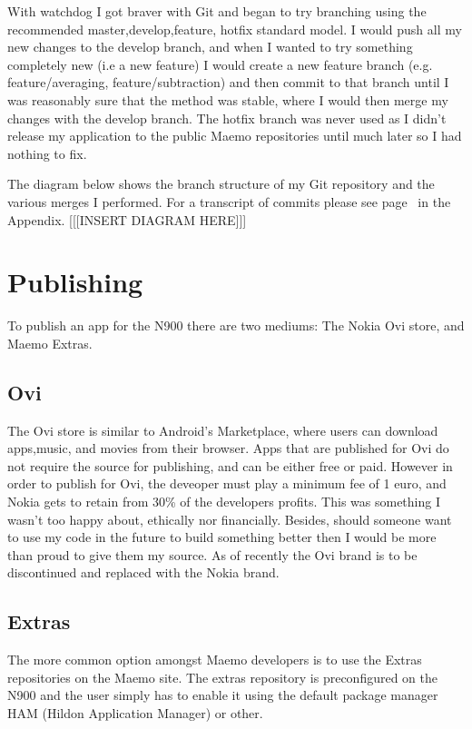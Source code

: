 With watchdog I got braver with Git and began to try branching using the recommended master,develop,feature, hotfix standard model. I would push all my new changes to the develop branch, and when I wanted to try something completely new (i.e a new feature) I would create a new feature branch (e.g. feature/averaging, feature/subtraction) and then commit to that branch until I was reasonably sure that the method was stable, where I would then merge my changes with the develop branch. The hotfix branch was never used as I didn’t release my application to the public Maemo repositories until much later so I had nothing to fix.

The diagram below shows the branch structure of my Git repository and the various merges I performed. For a transcript of commits please see page~\pageref{commits} in the Appendix.
[[[INSERT DIAGRAM HERE]]]



\section{Publishing}
To publish an app for the N900 there are two mediums: The Nokia Ovi store, and Maemo Extras.

\subsection{Ovi}
The Ovi store is similar to Android’s Marketplace, where users can download apps,music, and movies from their browser. Apps that are published for Ovi do not require the source for publishing, and can be either free or paid. However in order to publish for Ovi, the deveoper must play a minimum fee of 1 euro, and Nokia gets to retain from 30\% of the developers profits. This was something I wasn’t too happy about, ethically nor financially. Besides, should someone want to use my code in the future to build something better then I would be more than proud to give them my source. As of recently the Ovi brand is to be discontinued and replaced with the Nokia brand.

\subsection{Extras}
The more common option amongst Maemo developers is to use the Extras repositories on the Maemo site. The extras repository is preconfigured on the N900 and the user simply has to enable it using the default package manager HAM (Hildon Application Manager) or other.

